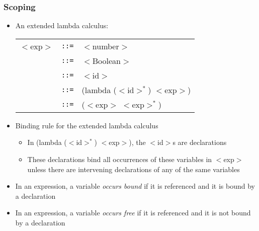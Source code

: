 \documentclass{beamer}
\newcommand{\is}{\texttt{::=}}
\begin{document}
\begin{frame}[fragile]
\frametitle{Scoping}
\begin{scriptsize}
\begin{itemize}
\item<1-> An extended lambda calculus:
\begin{tabular}{lll}
  $<$exp$>$ & \is{} & $<$number$>$ \\
            & \is{} & $<$Boolean$>$ \\
            & \is{} & $<$id$>$ \\
            & \is{} & (lambda ($<$id$>^*$) $<$exp$>$) \\
            & \is{} & ($<$exp$>$ $<$exp$>^*$) \\
\end{tabular}

\item<2-> Binding rule for the extended lambda calculus
  \begin{itemize}
    \item In (lambda ($<$id$>^*$) $<$exp$>$), the $<$id$>$s are declarations
    \item These declarations bind all occurrences of these variables in $<$exp$>$ unless there are intervening declarations of any of the same variables
  \end{itemize}

\item<2-> In an expression, a variable \emph{occurs bound} if it is referenced and it is bound by a declaration

\item<2-> In an expression, a variable \emph{occurs free} if it is referenced and it is not bound by a declaration

\end{itemize}
\end{scriptsize}
\end{frame}
\end{document}
